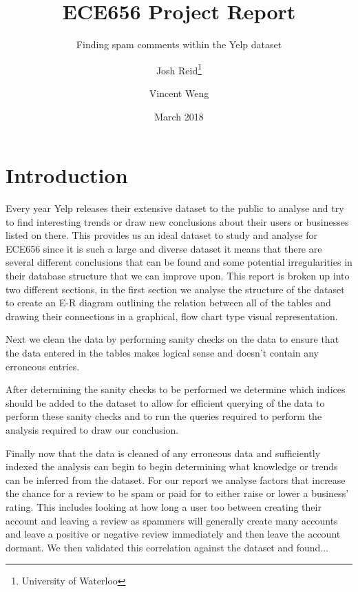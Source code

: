 \documentclass[12pt]{scrbook}
\title{ECE656 Project Report}
\subtitle{Finding spam comments within the Yelp dataset}
\date{March 2018}
\author{Josh Reid\thanks{University of Waterloo}
\and Vincent Weng\footnotemark[1]}
\begin{document}
\maketitle
\section{Introduction}
Every year Yelp releases their extensive dataset to the public to analyse and try to find interesting
trends or draw new conclusions about their users or businesses listed on there.
This provides us an ideal dataset to study and analyse for ECE656 since it is such a large and diverse
dataset it means that there are several different conclusions that can be found and some potential
irregularities in their database structure that we can improve upon.
This report is broken up into two different sections, in the first section we analyse the structure
of the dataset to create an E-R diagram outlining the relation between all of the tables and drawing
their connections in a graphical, flow chart type visual representation.

Next we clean the data by performing sanity checks on the data to ensure that the data entered in the
tables makes logical sense and doesn't contain any erroneous entries.

After determining the sanity checks to be performed we determine which indices should be added to the
dataset to allow for efficient querying of the data to perform these sanity checks and to run the queries
required to perform the analysis required to draw our conclusion.

Finally now that the data is cleaned of any erroneous data and sufficiently indexed the analysis can
begin to begin determining what knowledge or trends can be inferred from the dataset.
For our report we analyse factors that increase the chance for a review to be spam or paid for to
either raise or lower a business' rating.
This includes looking at how long a user too between creating their account and leaving a review as
spammers will generally create many accounts and leave a positive or negative review immediately and then
leave the account dormant.
We then validated this correlation against the dataset and found...
\end{document}
